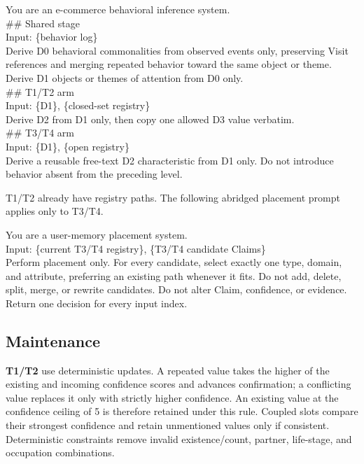 \documentclass[sigconf,nonacm,balance=false]{acmart}
\begin{document}
\begin{tcolorbox}[breakable, colback=black!2, colframe=black!25, boxrule=0.3pt, arc=1mm, left=4pt, right=4pt, top=3pt, bottom=3pt, before skip=4pt, after skip=4pt]
\footnotesize\ttfamily\RaggedRight
        You are an e-commerce behavioral inference system.\\[0.3em]
        \#\# Shared stage\\
        Input: \{behavior log\}\\
        Derive D0 behavioral commonalities from observed events only, preserving Visit references and merging repeated behavior toward the same object or theme. Derive D1 objects or themes of attention from D0 only.\\[0.3em]
        \#\# T1/T2 arm\\
        Input: \{D1\}, \{closed-set registry\}\\
        Derive D2 from D1 only, then copy one allowed D3 value verbatim.\\[0.3em]
        \#\# T3/T4 arm\\
        Input: \{D1\}, \{open registry\}\\
        Derive a reusable free-text D2 characteristic from D1 only. Do not introduce behavior absent from the preceding level.
\end{tcolorbox}

T1/T2 already have registry paths. The following abridged placement prompt applies only to T3/T4.

\begin{tcolorbox}[breakable, colback=black!2, colframe=black!25, boxrule=0.3pt, arc=1mm, left=4pt, right=4pt, top=3pt, bottom=3pt, before skip=4pt, after skip=4pt]
\footnotesize\ttfamily\RaggedRight
You are a user-memory placement system.\\[0.3em]
Input: \{current T3/T4 registry\}, \{T3/T4 candidate Claims\}\\[0.3em]
Perform placement only. For every candidate, select exactly one type, domain, and attribute, preferring an existing path whenever it fits. Do not add, delete, split, merge, or rewrite candidates. Do not alter Claim, confidence, or evidence. Return one decision for every input index.
\end{tcolorbox}

\subsection{Maintenance}
\label{app:method-maintenance}
\textbf{T1/T2} use deterministic updates. A repeated value takes the higher of the existing and incoming confidence scores and advances confirmation; a conflicting value replaces it only with strictly higher confidence. An existing value at the confidence ceiling of 5 is therefore retained under this rule. Coupled slots compare their strongest confidence and retain unmentioned values only if consistent. Deterministic constraints remove invalid existence/count, partner, life-stage, and occupation combinations.
\end{document}
